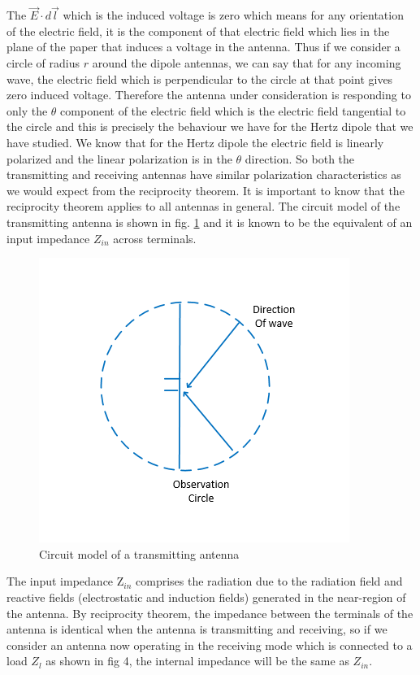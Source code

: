 The $\vec{E}\cdot d\vec{l}$ which is the induced voltage is zero which means for any orientation of the electric field, it is the component of that electric field which lies in the plane of the paper that induces a voltage in the antenna. Thus if we consider a circle of radius $r$ around the dipole antennas, we can say that for any incoming wave, the electric field which is perpendicular to the circle at that point gives zero induced voltage. Therefore the antenna under consideration is responding to only the $\theta$ component of the electric field which is the electric field tangential to the circle and this is precisely the behaviour we have for the Hertz dipole that we have studied. We know that for the Hertz dipole the electric field is linearly polarized and the linear polarization is in the $\theta$ direction. So both the transmitting and receiving antennas have similar polarization characteristics as we would expect from the reciprocity theorem. It is important to know that the reciprocity theorem applies to all antennas in general. The circuit model of the transmitting antenna is shown in fig. \ref{49.3} and it is known to be the equivalent of an input impedance $Z_{in}$ across terminals.
\begin{figure}[h]
\centering
\includegraphics[width=0.7\linewidth]{./graphics/fig52__2}
\caption{Circuit model of a transmitting antenna}
\label{49.3}
\end{figure}

The input impedance Z$_{in}$  comprises the radiation due to the radiation field and reactive fields (electrostatic and induction fields) generated in the near-region of the antenna.
By reciprocity theorem, the impedance between the terminals of the antenna is identical when the antenna is transmitting and receiving, so if we consider an antenna now operating in the receiving mode which is connected to a load $Z_{l}$ as shown in fig 4, the internal impedance will be the same as $Z_{in}$.

